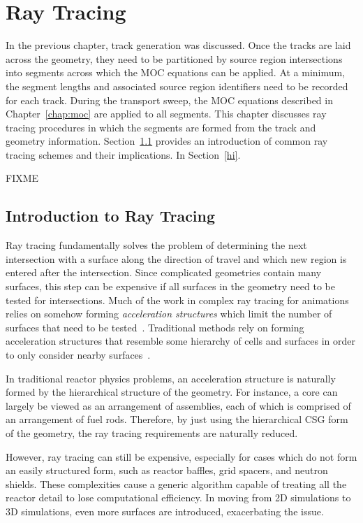 \chapter{Ray Tracing}
\label{chap:ray-tracing}

In the previous chapter, track generation was discussed. Once the tracks are laid across the geometry, they need to be partitioned by source region intersections into segments across which the MOC equations can be applied. At a minimum, the segment lengths and associated source region identifiers need to be recorded for each track. During the transport sweep, the MOC equations described in Chapter~\ref{chap:moc} are applied to all segments. This chapter discusses ray tracing procedures in which the segments are formed from the track and geometry information. Section~\ref{sec:rt-intro} provides an introduction of common ray tracing schemes and their implications. In Section~\ref{hi}.

FIXME


\section{Introduction to Ray Tracing}
\label{sec:rt-intro}

Ray tracing fundamentally solves the problem of determining the next intersection with a surface along the direction of travel and which new region is entered after the intersection. Since complicated geometries contain many surfaces, this step can be expensive if all surfaces in the geometry need to be tested for intersections. Much of the work in complex ray tracing for animations relies on somehow forming \textit{acceleration structures} which limit the number of surfaces that need to be tested~\cite{acceleration-structures}. Traditional methods rely on forming acceleration structures that resemble some hierarchy of cells and surfaces in order to only consider nearby surfaces~\cite{acc-struct-hierarchy}.

In traditional reactor physics problems, an acceleration structure is naturally formed by the hierarchical structure of the geometry. For instance, a core can largely be viewed as an arrangement of assemblies, each of which is comprised of an arrangement of fuel rods. Therefore, by just using the hierarchical CSG form of the geometry, the ray tracing requirements are naturally reduced.

However, ray tracing can still be expensive, especially for cases which do not form an easily structured form, such as reactor baffles, grid spacers, and neutron shields. These complexities cause a generic algorithm capable of treating all the reactor detail to lose computational efficiency. In moving from 2D simulations to 3D simulations, even more surfaces are introduced, exacerbating the issue.
	
